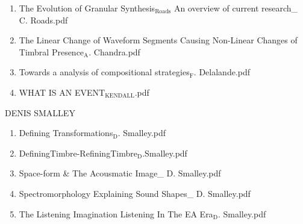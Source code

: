 \documentclass[11pt]{article}
\begin{document}
\begin{enumerate}
\item The Evolution of Granular Synthesis$_{\text{Roads}}$ An overview of current research\_ C. Roads.pdf
\label{sec-1-1-1-1-49-1-6-28}

\item The Linear Change of Waveform Segments Causing Non-Linear Changes of Timbral Presence$_{\text{A}}$. Chandra.pdf
\label{sec-1-1-1-1-49-1-6-29}

\item Towards a analysis of compositional strategies$_{\text{F}}$. Delalande.pdf
\label{sec-1-1-1-1-49-1-6-30}

\item WHAT IS AN EVENT$_{\text{KENDALL}}$.pdf
\label{sec-1-1-1-1-49-1-6-31}
\end{enumerate}

\item DENIS SMALLEY
\label{sec-1-1-1-1-49-1-7}
\begin{enumerate}
\item Defining Transformations$_{\text{D}}$. Smalley.pdf
\label{sec-1-1-1-1-49-1-7-1}

\item DefiningTimbre-RefiningTimbre$_{\text{D}}$.Smalley.pdf
\label{sec-1-1-1-1-49-1-7-2}

\item Space-form \& The Acousmatic Image\_ D. Smalley.pdf
\label{sec-1-1-1-1-49-1-7-3}

\item Spectromorphology Explaining Sound Shapes\_ D. Smalley.pdf
\label{sec-1-1-1-1-49-1-7-4}

\item The Listening Imagination Listening In The EA Era$_{\text{D}}$. Smalley.pdf
\label{sec-1-1-1-1-49-1-7-5}
\end{enumerate}
\end{document}
